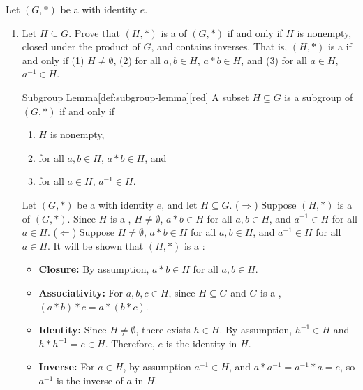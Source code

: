 \newpage
Let \((G, *)\) be a  with identity \(e\).
\begin{enumerate}
  \item Let \(H \subseteq G\).
  Prove that \((H, *)\) is a  of \((G, *)\) 
  if and only if \(H\) is nonempty, closed under the product of \(G\), 
  and contains inverses.
  That is, \((H, *)\) is a  if and only if 
  (1) \(H \neq \emptyset\), (2) for all \(a, b \in H\), \(a * b \in H\), 
  and (3) for all \(a \in H\), \(a^{-1} \in H\).
  \begin{define}{Subgroup Lemma}[def:subgroup-lemma][red]
    A subset \(H \subseteq G\) is a subgroup of \((G, *)\) if and only if
    \begin{enumerate}
      \item \(H\) is nonempty,
      \item for all \(a, b \in H\), \(a * b \in H\), and
      \item for all \(a \in H\), \(a^{-1} \in H\).
    \end{enumerate}
  \end{define}
  \begin{subprove}
    Let \((G, *)\) be a  with identity \(e\), and let \(H \subseteq G\).\proofstep
    (\(\Rightarrow\)) Suppose \((H, *)\) is a  of \((G, *)\). Since \(H\) is a , \(H \neq \emptyset\), \(a * b \in H\) for all \(a, b \in H\), and \(a^{-1} \in H\) for all \(a \in H\).
    \proofstep
    (\(\Leftarrow\)) Suppose \(H \neq \emptyset\), \(a * b \in H\) for all \(a, b \in H\), and \(a^{-1} \in H\) for all \(a \in H\). It will be shown that \((H, *)\) is a :
    \begin{itemize}
      \item \textbf{Closure:} By assumption, \(a * b \in H\) for all \(a, b \in H\).
      \item \textbf{Associativity:} For \(a, b, c \in H\), since \(H \subseteq G\) and \(G\) is a , \((a * b) * c = a * (b * c)\).
      \item \textbf{Identity:} Since \(H \neq \emptyset\), there exists \(h \in H\). By assumption, \(h^{-1} \in H\) and \(h * h^{-1} = e \in H\). Therefore, \(e\) is the identity in \(H\).
      \item \textbf{Inverse:} For \(a \in H\), by assumption \(a^{-1} \in H\), and \(a * a^{-1} = a^{-1} * a = e\), so \(a^{-1}\) is the inverse of \(a\) in \(H\).
    \end{itemize}

\end{subprove}
\end{enumerate}
